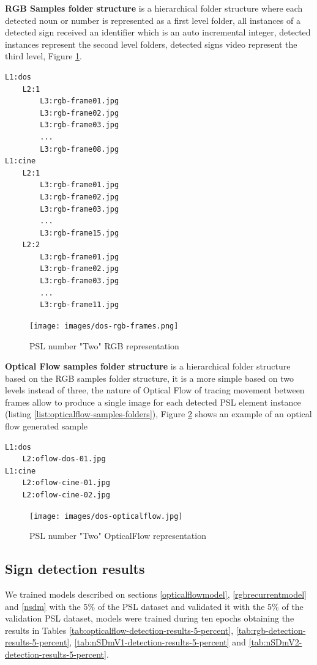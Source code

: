 \documentclass[twocolumn,conference]{article}
\begin{document}
\textbf{RGB Samples folder structure} is a hierarchical folder structure where each detected noun or number is represented as a first level folder, all instances of a detected sign received an identifier which is an auto incremental integer, detected instances represent the second level folders, detected signs video represent the third level, Figure \ref{fig:rgb-two}.
\begin{lstlisting}[caption=RGB Samples Folder Structure example, basicstyle=\ttfamily\small]
L1:dos
	L2:1
		L3:rgb-frame01.jpg
		L3:rgb-frame02.jpg
		L3:rgb-frame03.jpg
		...
		L3:rgb-frame08.jpg
L1:cine
	L2:1
		L3:rgb-frame01.jpg
		L3:rgb-frame02.jpg
		L3:rgb-frame03.jpg
		...
		L3:rgb-frame15.jpg
	L2:2
		L3:rgb-frame01.jpg
		L3:rgb-frame02.jpg
		L3:rgb-frame03.jpg
		...
		L3:rgb-frame11.jpg
\end{lstlisting}\label{list:rgb-samples-folders}

\begin{figure}[hbt!]
\texttt{[image: images/dos-rgb-frames.png]}
\caption{PSL number "Two" RGB representation}
\label{fig:rgb-two}
\end{figure}

\textbf{Optical Flow samples folder structure} is a hierarchical folder structure based on the RGB samples folder structure, it is a more simple based on two levels instead of three, the nature of Optical Flow of tracing movement between frames allow to produce a single image for each detected PSL element instance (listing \ref{list:opticalflow-samples-folders}), Figure \ref{fig:opticalflow-two} shows an example of an optical flow generated sample
\begin{lstlisting}[caption=Optical Flow Samples Folder Structure example, basicstyle=\ttfamily\small]
L1:dos
	L2:oflow-dos-01.jpg
L1:cine
	L2:oflow-cine-01.jpg
	L2:oflow-cine-02.jpg
\end{lstlisting}\label{list:opticalflow-samples-folders}
\begin{figure}[hbt!]
\texttt{[image: images/dos-opticalflow.jpg]}
\caption{PSL number "Two" OpticalFlow representation}
\label{fig:opticalflow-two}
\end{figure}

\subsection{Sign detection results}
We trained models described on sections \ref{opticalflowmodel}, \ref{rgbrecurrentmodel} and \ref{nsdm} with the 5\% of the PSL dataset and validated it with the 5\% of the validation PSL dataset, models were trained during ten epochs obtaining the results in Tables \ref{tab:opticalflow-detection-results-5-percent}, \ref{tab:rgb-detection-results-5-percent}, \ref{tab:nSDmV1-detection-results-5-percent} and \ref{tab:nSDmV2-detection-results-5-percent}.
\end{document}
